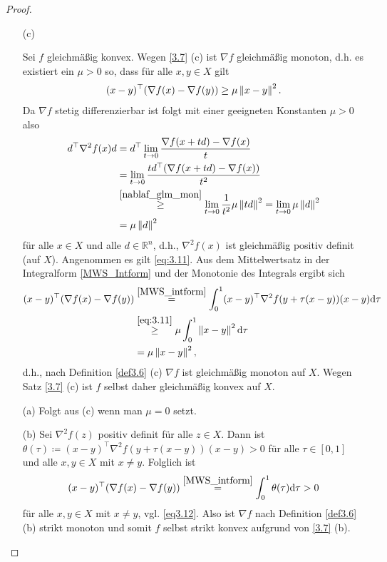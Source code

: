 \begin{proof}
	\begin{itemize}%
		\item[(c)] 
		\begin{proof-equivalence}
			\hinrichtung Sei $f$ gleichmäßig konvex. Wegen \cref{3.7} (c) ist
			$\nabla f$ gleichmäßig monoton, d.h. es existiert ein $\mu>0$ so,
			dass für alle $x,y\in X$ gilt
			\begin{align}\label{nablaf_glm_mon}
				(x-y)^\top(\nabla f(x)-\nabla f(y))\geq\mu\left\lVert x-y \right\rVert^2.
			\end{align}
			Da $\nabla f$ stetig differenzierbar ist folgt mit einer geeigneten
			Konstanten $\mu>0$ also
			\begin{align*}
				d^\top\nabla^2 f(x) d
				&= d^\top \lim_{t\to 0} \frac{\nabla f(x+td) - \nabla f(x)}{t}\\
				&= \lim_{t\to 0} \frac{td^\top(\nabla f(x+td) - \nabla f(x))}{t^2}\\
				&\stackrel{\eqref{nablaf_glm_mon}}{\geq} \lim_{t\to 0} \frac{1}{t^2} \mu\left\lVert td \right\rVert^2
				= \lim_{t\to 0} \mu\left\lVert d \right\rVert^2\\
				&= \mu\left\lVert d \right\rVert^2\\
			\end{align*}
			für alle $x\in X$ und alle $d\in\mathbb{R}^n$, d.h., $\nabla^2 f(x)$
			ist gleichmäßig positiv definit (auf $X$).
			\rueckrichtung Angenommen es gilt \eqref{eq:3.11}.  Aus dem Mittelwertsatz in der Integralform \ref{MWS_Intform} und der Monotonie des Integrals ergibt sich
			\begin{align}    
				(x-y)^\top(\nabla f(x)-\nabla f(y))
				&\stackrel{\eqref{MWS_intform}}{=}
				\int_0^1 (x-y)^\top \nabla^2f(y+\tau(x-y))(x-y)\textnormal{d} \tau\nonumber\\
				&\stackrel{\eqref{eq:3.11}}{\geq} \mu\int_0^1 \left\lVert x-y \right\rVert^2\textnormal{d}\tau\nonumber\\
				&= \mu\left\lVert x-y \right\rVert^2,\label{eq3.12}
			\end{align}
			d.h., nach Definition \ref{def3.6} (c) $\nabla f$ ist gleichmäßig
			monoton auf $X$. Wegen Satz
			\ref{3.7} (c) ist $f$ selbst daher gleichmäßig konvex auf $X$.
		\end{proof-equivalence}
		
		\item[(a)] Folgt aus (c) wenn man $\mu=0$ setzt.
		
		\item[(b)] Sei $\nabla^2 f(z)$ positiv definit für alle $z\in X$.
		Dann ist $\theta(\tau)\coloneqq (x-y)^\top\nabla^2 f(y+\tau(x-y))(x-y)>0$
		für alle $\tau\in[0,1]$ und alle $x,y\in X$ mit $x\neq y$. Folglich
		ist
		\begin{align}
			(x-y)^\top(\nabla f(x)-\nabla f(y))
			\stackrel{\eqref{MWS_intform}}{=} \int_0^1 \theta(\tau)\textnormal{d} \tau>0
		\end{align}
		für alle $x,y\in X$ mit $x\neq y$, vgl. \eqref{eq3.12}. Also ist
		$\nabla f$ nach Definition \ref{def3.6} (b) strikt monoton und
		somit $f$ selbst strikt konvex aufgrund von \cref{3.7} (b).
	\end{itemize}
\end{proof}

